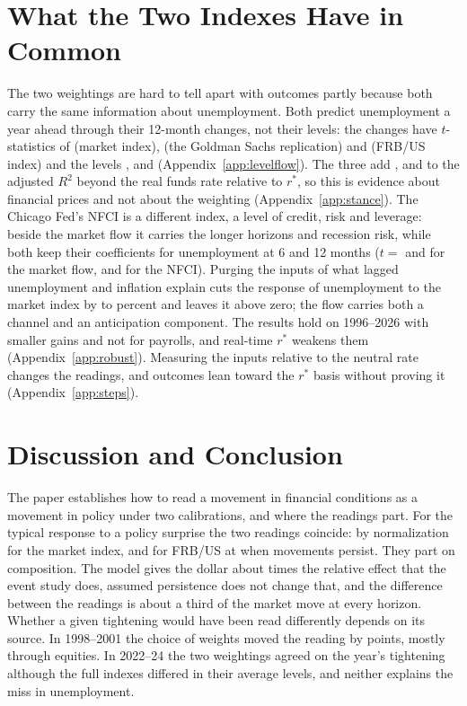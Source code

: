 \documentclass[11pt]{article}
\newcommand{\rs}{r^{*}}
\begin{document}

\FloatBarrier

\section{What the Two Indexes Have in Common}\label{sec:prices}
The two weightings are hard to tell apart with outcomes partly because both carry the same information about unemployment. Both predict unemployment a year ahead through their 12-month changes, not their levels: the changes have $t$-statistics of  (market index),  (the Goldman Sachs replication) and  (FRB/US index) and the levels ,  and  (Appendix~\ref{app:levelflow}). The three add ,  and  to the adjusted $R^2$ beyond the real funds rate relative to $\rs$, so this is evidence about financial prices and not about the weighting (Appendix~\ref{app:stance}). The Chicago Fed's NFCI is a different index, a level of credit, risk and leverage: beside the market flow it carries the longer horizons and recession risk, while both keep their coefficients for unemployment at 6 and 12 months ($t=$  and  for the market flow,  and  for the NFCI). Purging the inputs of what lagged unemployment and inflation explain cuts the response of unemployment to the market index by  to  percent and leaves it above zero; the flow carries both a channel and an anticipation component. The results hold on 1996--2026 with smaller gains and not for payrolls, and real-time $\rs$ weakens them (Appendix~\ref{app:robust}). Measuring the inputs relative to the neutral rate changes the readings, and outcomes lean toward the $\rs$ basis without proving it (Appendix~\ref{app:steps}).
\FloatBarrier

\section{Discussion and Conclusion}\label{sec:discussion}
The paper establishes how to read a movement in financial conditions as a movement in policy under two calibrations, and where the readings part. For the typical response to a policy surprise the two readings coincide: by normalization for the market index, and for FRB/US at  when movements persist. They part on composition. The model gives the dollar about  times the relative effect that the event study does, assumed persistence does not change that, and the difference between the readings is about a third of the market move at every horizon. Whether a given tightening would have been read differently depends on its source. In 1998--2001 the choice of weights moved the reading by  points, mostly through equities. In 2022--24 the two weightings agreed on the year's tightening although the full indexes differed in their average levels, and neither explains the miss in unemployment.
\end{document}
